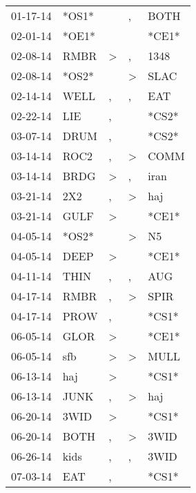 \begin{supertabular}{lllll}
 01-17-14 &  *OS1* &                  &                , &   BOTH \\
 02-01-14 &  *OE1* &                  &                  &  *CE1* \\
 02-08-14 &   RMBR &     \textgreater &                , &   1348 \\
 02-08-14 &  *OS2* &                  &     \textgreater &   SLAC \\
 02-14-14 &   WELL &                , &                , &    EAT \\
 02-22-14 &    LIE &                , &                  &  *CS2* \\
 03-07-14 &   DRUM &                , &                  &  *CS2* \\
 03-14-14 &   ROC2 &                , &     \textgreater &   COMM \\
 03-14-14 &   BRDG &     \textgreater &                , &   iran \\
 03-21-14 &    2X2 &                , &     \textgreater &    haj \\
 03-21-14 &   GULF &     \textgreater &                  &  *CE1* \\
 04-05-14 &  *OS2* &                  &     \textgreater &     N5 \\
 04-05-14 &   DEEP &     \textgreater &                  &  *CE1* \\
 04-11-14 &   THIN &                , &                , &    AUG \\
 04-17-14 &   RMBR &                , &     \textgreater &   SPIR \\
 04-17-14 &   PROW &                , &                  &  *CS1* \\
 06-05-14 &   GLOR &     \textgreater &                  &  *CE1* \\
 06-05-14 &    sfb &     \textgreater &     \textgreater &   MULL \\
 06-13-14 &    haj &     \textgreater &                  &  *CS1* \\
 06-13-14 &   JUNK &                , &     \textgreater &    haj \\
 06-20-14 &   3WID &     \textgreater &                  &  *CS1* \\
 06-20-14 &   BOTH &                , &     \textgreater &   3WID \\
 06-26-14 &   kids &                , &                , &   3WID \\
 07-03-14 &    EAT &                , &                  &  *CS1* \\

\end{supertabular}
